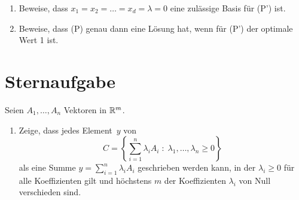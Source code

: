 \documentclass{uebung_cs}
\begin{document}
\begin{aufgabe}
	\begin{enumerate}
		\item Beweise, dass $x_1 = x_2 = \dots = x_d = \lambda = 0$ eine zulässige Basis für (P') ist.
		\item Beweise, dass (P) genau dann eine Lösung hat, wenn für (P') der optimale Wert 1 ist.
	\end{enumerate}
\end{aufgabe}


\section*{Sternaufgabe}

\begin{aufgabe}
%
	Seien $A_1,\dots , A_n$ Vektoren in $\mathbb{R}^m$.
	\begin{enumerate}
		\item Zeige, dass jedes Element~$y$ von 
			\[
				C=\left\{\sum_{i=1}^n \lambda_i A_i \;:\; \lambda_1, \dots , \lambda_n\geq 0\right\}
			\]
			als eine Summe $y=\sum_{i=1}^n \lambda_i A_i$ geschrieben werden kann, in der $\lambda_i\geq 0$ für alle Koeffizienten gilt und höchstens $m$ der Koeffizienten $\lambda_i$ von Null verschieden sind. 


\end{enumerate}
\end{aufgabe}
\end{document}
